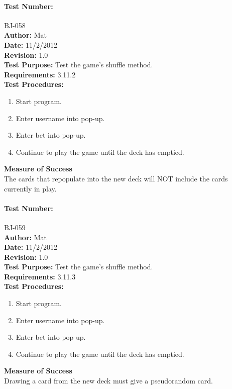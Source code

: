 \documentclass{article}
\begin{document}
\paragraph{Test Number:} BJ-058\\
\textbf{Author:} Mat\\
\textbf{Date:} 11/2/2012\\
\textbf{Revision:} 1.0\\
\textbf{Test Purpose:} Test the game's shuffle method.\\
\textbf{Requirements:} 3.11.2 \\
\textbf{Test Procedures:} 
\begin{enumerate}
\item Start program.
\item Enter username into pop-up.
\item Enter bet into pop-up.
\item Continue to play the game until the deck has emptied.
\end{enumerate}
\textbf{Measure of Success}\\The cards that repopulate into the new deck will NOT include the cards currently in play.
\paragraph{Test Number:} BJ-059\\
\textbf{Author:} Mat\\
\textbf{Date:} 11/2/2012\\
\textbf{Revision:} 1.0\\
\textbf{Test Purpose:} Test the game's shuffle method.\\
\textbf{Requirements:} 3.11.3 \\
\textbf{Test Procedures:} 
\begin{enumerate}
\item Start program.
\item Enter username into pop-up.
\item Enter bet into pop-up.
\item Continue to play the game until the deck has emptied.
\end{enumerate}
\textbf{Measure of Success}\\Drawing a card from the new deck must give a pseudorandom card.
\end{document}
